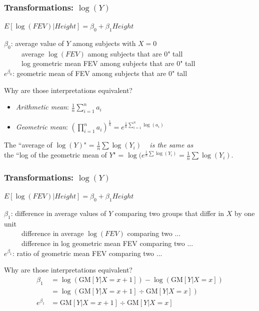 \documentclass[12pt, 
hyperref={colorlinks=true, linkcolor=blue, urlcolor=cyan}]{beamer}
\begin{document}
\begin{frame}
\frametitle{Transformations: $\log(Y)$}
\begin{center} $E[\log(FEV)|Height] = \beta_0 + \beta_1 Height$ \end{center}
$\beta_0$: average value of $Y$ among subjects with $X = 0$\\ \pause
\ \ \ \ \ average $\log(FEV)$ among subjects that are 0" tall \\ \pause
\ \ \ \ \ log geometric mean FEV among subjects that are 0" tall \\ 
\color{blue} $e^{\beta_0}$: geometric mean of FEV among subjects that are 0" tall \color{black}\pause

Why are those interpretations equivalent?\vspace{-0.3cm}
\begin{itemize}
\item[] \textit{Arithmetic mean}: $\frac{1}{n} \sum_{i=1}^n a_i$
\item[] \textit{Geometric mean}: $\left(\prod_{i=1}^n a_i\right)^{\frac{1}{n}} = e^{\frac{1}{n} \sum_{i=1}^n \log(a_i)}$
\end{itemize}
\vspace{-0.3cm}
\begin{center} \begin{footnotesize}The \color{blue} ``average of $\log(Y)$" \color{black} = $\frac{1}{n}\sum \log(Y_i)$ \ \color{blue} \textit{is the same as} \color{black}\\the \color{blue}``log of the geometric mean of $Y$" \color{black}= $\log(e^{\frac{1}{n}\sum \log(Y_i)} = \frac{1}{n}\sum \log(Y_i)$.\end{footnotesize}\end{center}
\end{frame}

\begin{frame}
\frametitle{Transformations: $\log(Y)$}
\begin{center} $E[\log(FEV)|Height] = \beta_0 + \beta_1 Height$ \end{center}
$\beta_1$: difference in average values of $Y$ comparing two groups that differ in $X$ by one unit\\ \pause
\ \ \ \ \ difference in average $\log(FEV)$ comparing two ...\\ \pause
\ \ \ \ \ difference in log geometric mean FEV comparing two ... \\ 
\color{blue} $e^{\beta_1}$: ratio of geometric mean FEV comparing two ... \color{black} \pause

Why are those interpretations equivalent?\vspace{-0.3cm}
\begin{align*}
\beta_1 & = \log(\text{GM}[Y|X=x+1])-\log(\text{GM}[Y|X=x])\\
& = \log\left(\text{GM}[Y|X=x+1]\div\text{GM}[Y|X=x]\right)\\
e^{\beta_1} & = \text{GM}[Y|X=x+1]\div\text{GM}[Y|X=x]
\end{align*}
\end{frame}
\end{document}
